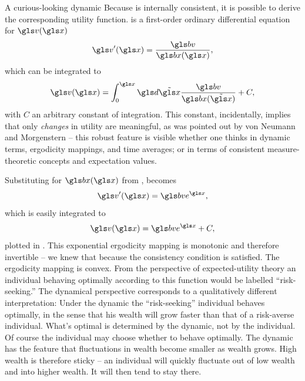 \begin{itemize}
\begin{example}{A curious-looking dynamic}
Because  is internally consistent, it is possible to derive the corresponding utility function.
 is a first-order ordinary differential equation for $\gv(\x)$
\begin{align}
\gv'(\x)=\frac{\bv}{\bx(\x)},
\elabel{diff_eq_u}
\end{align}
which can be integrated to
\begin{align}
\gv(\x)=\int_0^\x \gd\tilde{\x} \frac{\bv}{\bx(\tilde{\x})}+C,
\end{align}
with $C$ an arbitrary constant of integration. This constant, incidentally, implies that 
only {\it changes} in utility are meaningful, as was pointed out by von 
Neumann and Morgenstern \cite{vonNeumannMorgenstern1944} -- this robust feature
is visible whether one thinks in dynamic terms, ergodicity mappings, and time averages; 
or in terms of consistent measure-theoretic concepts and expectation values.

Substituting for $\bx(\x)$ from ,  becomes
\begin{equation}
\gv'(\x)=\bv e^\x,
\end{equation}
which is easily integrated to
\begin{equation}
\gv(\x)=\bv e^\x +C,
\elabel{test_dyn_u}
\end{equation}
plotted in . This exponential ergodicity mapping is monotonic and 
therefore invertible -- we knew that because the consistency condition is satisfied. 
The ergodicity mapping is convex. From the 
perspective of expected-utility theory an individual behaving optimally according to 
this function would be labelled ``risk-seeking.'' 
The dynamical perspective corresponds to a qualitatively different interpretation: 
Under the dynamic  the ``risk-seeking'' individual behaves optimally, 
in the sense that his wealth will grow faster than that of a risk-averse individual. 
What's optimal is determined by the dynamic, not by the individual. Of course the 
individual may choose whether to behave optimally. The dynamic  
has the feature that fluctuations in wealth become smaller as wealth grows. High 
wealth is therefore sticky -- an individual will quickly fluctuate out of 
low wealth and into higher wealth. It will then tend to stay there. 
\end{example}


\end{itemize}
